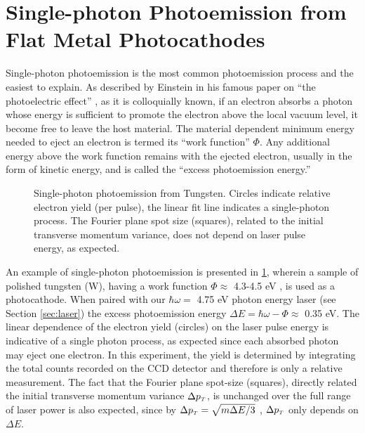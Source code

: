 
\section{Single-photon Photoemission from Flat Metal Photocathodes}

Single-photon photoemission is the most common photoemission process and the easiest to explain.
As described by Einstein in his famous paper on ``the photoelectric effect'' \cite{einstein_uber_1905}, as it is colloquially known, if an electron absorbs a photon whose energy is sufficient to promote the electron above the local vacuum level, it become free to leave the host material.
The material dependent minimum energy needed to eject an electron is termed its ``work function'' $\Phi$.
Any additional energy above the work function remains with the ejected electron, usually in the form of kinetic energy, and is called the ``excess photoemission energy.''

\begin{figure}
  \centering
  
  \caption[Single-photon photoemission from Tungsten]{
    Single-photon photoemission from Tungsten.
    Circles indicate relative electron yield (per pulse), the linear fit line indicates a single-photon process.
    The Fourier plane spot size (squares), related to the initial transverse momentum variance, does not depend on laser pulse energy, as expected.
  }
  \label{fig:single_photon_tungsten}
\end{figure}

An example of single-photon photoemission is presented in \ref{fig:single_photon_tungsten}, wherein a sample of polished tungsten (W), having a work function $\Phi \approx $ 4.3-4.5 eV \cite{yen_thermally_1980}, is used as a photocathode.
When paired with our $\hbar \omega = $ 4.75 eV photon energy laser (see Section \ref{sec:laser}) the excess photoemission energy $\Delta E = \hbar \omega - \Phi \approx $ 0.35 eV.
The linear dependence of the electron yield (circles) on the laser pulse energy is indicative of a single photon process, as expected since each absorbed photon may eject one electron.
In this experiment, the yield is determined by integrating the total counts recorded on the CCD detector and therefore is only a relative measurement.
The fact that the Fourier plane spot-size (squares), directly related the initial transverse momentum variance $\Delta p_{{\scriptscriptstyle T}}$, is unchanged over the full range of laser power is also expected, since by $\Delta p_{{\scriptscriptstyle T}} = \sqrt{ m \Delta E / 3 } $ \cite{dowell_quantum_2009}, $\Delta p_{{\scriptscriptstyle T}}$ only depends on $\Delta E$.

